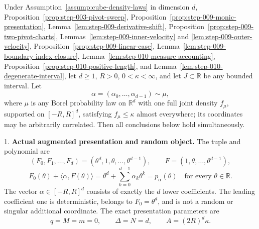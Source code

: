 \begin{proposition}
\label{prop:step-010-complete-affine-monic-wrapper}
Under Assumption~\ref{assump:cube-density-laws} in dimension \(d\), Proposition~\ref{prop:step-003-pivot-sweep}, Proposition~\ref{prop:step-009-monic-presentation}, Lemma~\ref{lem:step-009-derivative-shift}, Proposition~\ref{prop:step-009-two-pivot-charts}, Lemmas~\ref{lem:step-009-inner-velocity} and \ref{lem:step-009-outer-velocity}, Proposition~\ref{prop:step-009-linear-case}, Lemma~\ref{lem:step-009-boundary-index-closure}, Lemma~\ref{lem:step-010-measure-accounting}, Proposition~\ref{prop:step-010-positive-length}, and Lemma~\ref{lem:step-010-degenerate-interval}, let \(d\geq1\), \(R>0\), \(0<\kappa<\infty\), and let \(J\subset\mathbb R\) be any bounded interval. Let
\begin{equation}
\label{eq:appendix-display-334}
\alpha=(\alpha_0,\ldots,\alpha_{d-1})\sim\mu,
\end{equation}
where \(\mu\) is any Borel probability law on \(\mathbb R^d\) with one full joint density \(f_\mu\), supported on \([-R,R]^d\), satisfying \(f_\mu\leq\kappa\) almost everywhere; its coordinates may be arbitrarily correlated. Then all conclusions below hold simultaneously.

1. \textbf{Actual augmented presentation and random object.} The tuple and polynomial are
\begin{equation}
\label{eq:appendix-indented-008}
   (F_0,F_1,\ldots,F_d)
   =(\theta^d,1,\theta,\ldots,\theta^{d-1}),
   \qquad
   F=(1,\theta,\ldots,\theta^{d-1}),
\end{equation}
\begin{equation}
\label{eq:appendix-indented-009}
   F_0(\theta)+\langle\alpha,F(\theta)\rangle
   =\theta^d+\sum_{k=0}^{d-1}\alpha_k\theta^k
   =p_\alpha(\theta)
   \quad\text{for every }\theta\in\mathbb R.
\end{equation}
   The vector \(\alpha\in[-R,R]^d\) consists of exactly the \(d\) lower coefficients. The leading coefficient one is deterministic, belongs to \(F_0=\theta^d\), and is not a random or singular additional coordinate. The exact presentation parameters are
\begin{equation}
\label{eq:appendix-indented-010}
   q=M=m=0,\qquad
   \Delta=N=d,\qquad
   A=(2R)^d\kappa.
\end{equation}


\end{proposition}
